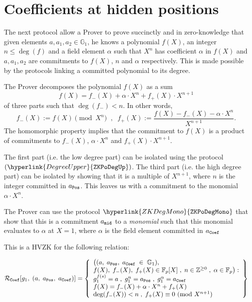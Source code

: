 \documentclass[11pt, lettersize, notitlepage, leqno, footskip=0.6cm]{article}
\newcommand{\bz}{\mathbb Z}
\newcommand{\bFp}{\mathbb{F}_p}
\newcommand{\mc}{\mathcal}
\newcommand{\mb}{\mathbb}
\newcommand{\al}{\alpha}
\newcommand{\vs}{\vspace{-0.15cm}}
\newcommand{\Mod}[1]{\ (\mathrm{mod}\ #1)}
\numberwithin{equation}{section}
\begin{document}
\bigskip









\section{\fontsize{11}{11}\selectfont Coefficients at hidden positions}







The next protocol allow a Prover to prove succinctly and in zero-knowledge that given elements $a,a_1,a_2\in \mb{G}_1$, he knows a polynomial $f(X)$, an integer $n\leq \deg(f)$ and a field element $\al$ such that $X^n$ has coefficient $\al$ in $f(X)$ and $a,a_1,a_2$ are commitments to $f(X)$, $n$ and $\al$ respectively. This is made possible by the protocols linking a committed polynomial to its degree.

The Prover decomposes the polynomial $f(X)$ as a sum \vs $$f(X) = f_{-}(X) + \al \cdot X^n +  f_{+}(X) \cdot X^{n+1} $$ of three parts such that $\deg(f_{-})< n$. In other words, \vs $$f_{-}(X):= f(X)\pmod{X^n}\;\;,\;\;f_{+}(X):= \frac{f(X)-f_{-}(X) - \al\cdot X^n}{X^{n+1}}. $$ The homomorphic property implies that the  commitment to $f(X)$ is a product of commitments to $f_{-}(X)$, $\al\cdot X^n$ and $f_{+}(X)\cdot X^{n+1}$. 

The first part (i.e. the low degree part) can be isolated using the protocol $(\hyperlink{DegreeUpper}{\tt{ZKPoDegUp}})$. The third part (i.e. the high degree part) can be isolated by showing that it is a multiple of $X^{n+1}$, where $n$ is the integer committed in $a_{\tt{Pos}}$. This leaves us with a commitment to the monomial $\al\cdot X^n$. 

The Prover can use the protocol $\hyperlink{ZKDegMono}{\tt{ZKPoDegMono}}$ that show that this is a commitment $a_{\tt{mid}}$ to a \textit{monomial} such that this monomial evaluates to $\al$ at $X = 1$, where $\al$ is the field element committed in $a_{\tt{Coef}}$ \vspace{1mm}



This is a HVZK for the following relation:

\vspace{-4mm} $$\mc{R}_{\tt{Coef}}[g_1,\;(a,\;a_{\tt{Pos}},\;a_{\tt{Coef}})] = \left\{\begin{array}{l} 
\big((a,\;a_{\tt{Pos}},\;a_{\tt{Coef}}\;\in\;\mb{G}_1),\\ f(X),\; f_{-}(X),\; f_{+}(X)\in \bFp[X]\;,\;n\in \bz^{\geq 0}\;,\;\al \in \bFp \big):\\ g_1^{f(s)} = a\;,\; g_1^{n} = a_{\tt{Pos}}\;,\; g_1^{\al} = a_{\tt{Coef}}  
\\ f(X) = f_{-}(X) + \al\cdot X^n + f_{+}(X)\\
\deg(f_{-}(X)) < n\;,\; f_{+}(X)\equiv 0 \Mod{X^{n+1}} \end{array}\right\} \vs $$ 
\end{document}
